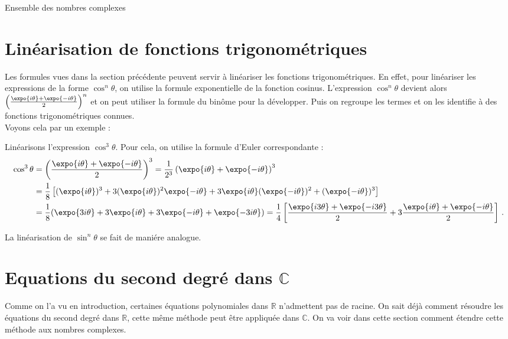 \begin{chapter}{Ensemble des nombres complexes}
\section{Lin\'earisation de fonctions trigonom\'etriques}
%
%
Les formules vues dans la section pr\'ec\'edente peuvent servir \`a lin\'eariser les fonctions trigonom\'etriques.
En effet, pour lin\'eariser les expressions de la forme $\cos ^n \theta$, on utilise la formule exponentielle de la fonction cosinus.
L'expression $\cos ^n \theta$ devient alors $\left( \frac{ \expo{i \theta} + \expo{-i \theta} }{ 2 } \right)^n$ et on peut utiliser la formule du bin\^ome pour la d\'evelopper.
Puis on regroupe les termes et on les identifie \`a des fonctions trigonom\'etriques connues. \\
Voyons cela par un exemple :
\begin{ex}
	      Lin\'earisons l'expression $\cos ^3 \theta$.
	      Pour cela, on utilise la formule d'Euler correspondante :
      \begin{align*}
            \cos ^3 \theta & = \left( \frac{\expo{i \theta } + \expo{- i \theta }}{2} \right)^3                            
                             = \frac{1}{2^3} \left( \expo{i \theta} + \expo{ - i \theta} \right)^3                         \\
                           & = \frac{1}{8} \left[ (\expo{i \theta})^3 + 3 (\expo{i \theta})^2 \expo{-i \theta} 
                                 + 3 \expo{ i \theta} (\expo{-i \theta})^2 + (\expo{-i \theta})^3 \right]                  \\
                           & = \frac{1}{8} (\expo{3i \theta} + 3 \expo{i \theta} + 3 \expo{-i \theta} + \expo{-3i \theta}) 
                             = \frac{1}{4} \left[ \frac{\expo{i 3\theta} + \expo{-i 3\theta}}{2} 
                                 + 3 \frac{ \expo{i \theta} + \expo{-i \theta} }{2} \right]                                \,.
      \end{align*}
\end{ex}

La lin\'earisation de $\sin ^n \theta$ se fait de mani\'ere analogue.

\section{Equations du second degr\'e dans $\mathbb{C}$}
%
%
Comme on l'a vu en introduction, certaines \'equations polynomiales dans $\mathbb{R}$ n'admettent pas de racine.
On sait d\'ej\`a comment r\'esoudre les \'equations du second degr\'e dans $\mathbb{R}$, cette m\^eme m\'ethode peut \^etre appliqu\'ee dans $\mathbb{C}$.
On va voir dans cette section comment \'etendre cette m\'ethode aux nombres complexes.
%

\end{chapter}
